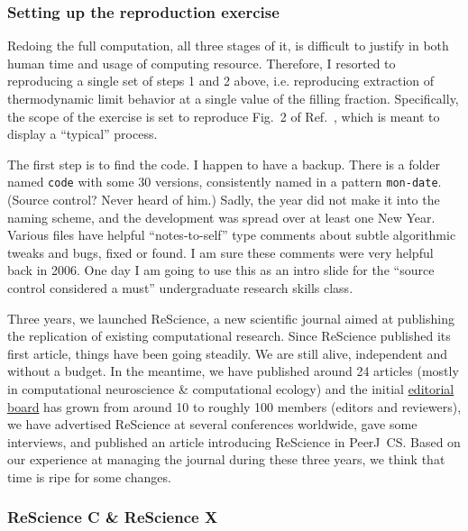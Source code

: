 \subsubsection{Setting up the reproduction exercise}

Redoing the full computation, all three stages of it, is difficult to justify
in both human time and usage of computing resource. Therefore, I resorted to reproducing a
single set of steps 1 and 2 above, i.e. reproducing extraction of thermodynamic
limit behavior at a single value of the filling fraction. Specifically, the scope of the exercise
is set to reproduce Fig.\ 2 of Ref.\ \cite{PRL:2006}, which is meant to display a ``typical''
process. 
 
The first step is to find the code. I happen to have a backup.
There is a folder named \texttt{code} with some 30 versions,
consistently named in a pattern \texttt{mon-date}. (Source control? Never
heard of him.) Sadly, the year did not make it into the naming scheme, and the
development was spread over at least one New Year. 
Various files have helpful ``notes-to-self'' type comments
about subtle algorithmic  tweaks and bugs, fixed or found. I am sure these
comments were very helpful back in 2006. 
One day I am going to use this as an intro slide for the
``source control considered a must'' undergraduate research skills class.

\cite{MCWA}


Three years, we launched ReScience, a new scientific journal aimed at publishing the
replication of existing computational research. Since ReScience published its first
article\supercite{Topalidou:2015}, things have been
going steadily. We are still alive, independent and without a budget. In the
meantime, we have published around 24 articles (mostly in computational
neuroscience \& computational ecology) and the initial
\href{https://rescience-c.github.io/board/}{editorial board} has grown from
around 10 to roughly 100 members (editors and reviewers), we have advertised
ReScience at several conferences worldwide, gave some
interviews\supercite{Science:2018}, and published an article introducing
ReScience in PeerJ~CS\supercite{Rougier:2017}. Based on our
experience\supercite{Rougier:2018} at managing the journal during these three
years, we think that time is ripe for some changes.

\subsubsection{ReScience C \& ReScience X}

